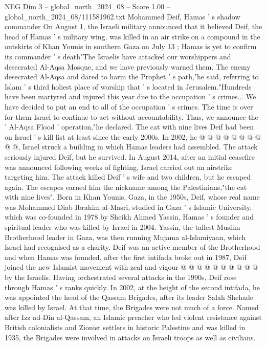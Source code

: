 \begin{textsample}{NEG Dim 3 – global\_north\_2024\_08 – Score 1.00 – global\_north\_2024\_08/111581962.txt}  \label{ex:f3_neg_315}
Mohammed Deif, Hamas ' s shadow commander On August 1, the Israeli military announced that it believed Deif, the head of Hamas ' s military wing, was killed in an air strike on a compound in the outskirts of Khan Younis in southern Gaza on July 13 ; Hamas is yet to confirm its commander ' s death"The Israelis have attacked our worshippers and desecrated Al-Aqsa Mosque, and we have previously warned them.
The enemy desecrated Al-Aqsa and dared to harm the Prophet ' s path,"he said, referring to Islam ' s third holiest place of worship that ' s located in Jerusalem."Hundreds have been martyred and injured this year due to the occupation ' s crimes...
We have decided to put an end to all of the occupation ' s crimes.
The time is over for them Israel to continue to act without accountability.
Thus, we announce the ' Al-Aqsa Flood ' operation,"he declared.
The cat with nine lives Deif had been on Israel ' s kill list at least since the early 2000s.
In 2002, he @ @ @ @ @ @ @ @ @ @, Israel struck a building in which Hamas leaders had assembled.
The attack seriously injured Deif, but he survived.
In August 2014, after an initial ceasefire was announced following weeks of fighting, Israel carried out an airstrike targeting him.
The attack killed Deif ' s wife and two children, but he escaped again.
The escapes earned him the nickname among the Palestinians,"the cat with nine lives".
Born in Khan Younis, Gaza, in the 1950s, Deif, whose real name was Mohammed Diab Ibrahim al-Masri, studied in Gaza ' s Islamic University, which was co-founded in 1978 by Sheikh Ahmed Yassin, Hamas ' s founder and spiritual leader who was killed by Israel in 2004.
Yassin, the tallest Muslim Brotherhood leader in Gaza, was then running Mujama al-Islamiyaan, which Israel had recognised as a charity.
Deif was an active member of the Brotherhood and when Hamas was founded, after the first intifada broke out in 1987, Deif joined the new Islamist movement with zeal and vigour @ @ @ @ @ @ @ @ @ @ by the Israelis.
Having orchestrated several attacks in the 1990s, Deif rose through Hamas ' s ranks quickly.
In 2002, at the height of the second intifada, he was appointed the head of the Qassam Brigades, after its leader Salah Shehade was killed by Israel.
At that time, the Brigades were not much of a force.
Named after Izz ad-Din al-Qassam, an Islamic preacher who led violent resistance against British colonialists and Zionist settlers in historic Palestine and was killed in 1935, the Brigades were involved in attacks on Israeli troops as well as civilians.

\end{textsample}
